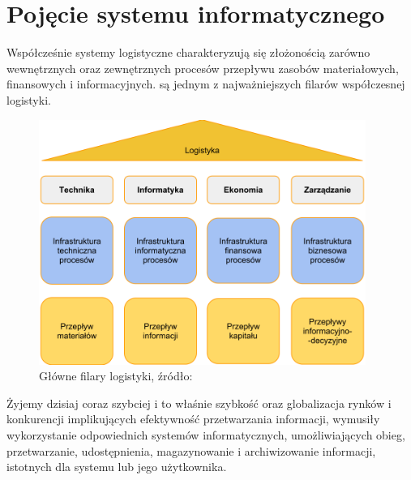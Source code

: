 \section{Pojęcie systemu informatycznego}	
	Współcześnie systemy logistyczne charakteryzują się złożonością zarówno wewnętrznych oraz zewnętrznych
	procesów przepływu zasobów materiałowych, finansowych i informacyjnych. są jednym z najważniejszych filarów
	współczesnej logistyki.
	\begin{figure}[h]
		\centering
		\includegraphics[width=0.95\textwidth]{images/filary_logistyki}
		\caption[Główne filary logistyki]{
			Główne filary logistyki, źródło: \cite{logistyka_w_przedsiebiorstwie}
		}
	\end{figure}
	Żyjemy dzisiaj coraz szybciej i to właśnie szybkość oraz globalizacja rynków i konkurencji
	implikujących efektywność przetwarzania informacji, wymusiły wykorzystanie odpowiednich
	systemów informatycznych, umożliwiających obieg, przetwarzanie, udostępnienia, magazynowanie
	i archiwizowanie informacji, istotnych dla systemu lub jego użytkownika.  	
	
